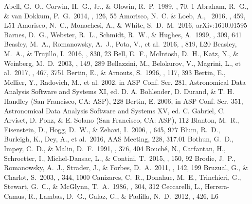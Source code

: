 \documentclass[twocolumn,trackchanges]{aastex61}
\begin{document}
\begin{thebibliography}{a}
 Abell, G.~O., Corwin, H.~G., Jr., \& Olowin, R.~P.\ 1989, \apjs, 70, 1 
 Abraham, R.~G., \& van Dokkum, P.~G.\ 2014, \pasp, 126, 55 
 Amorisco, N.~C. \& Loeb, A., \ 2016, \mnras, 459, L51
 Amorisco, N.~C., Monachesi, A., \& White, S.~D.~M.\ 2016, arXiv:1610.01595 
 Barnes, D.~G., Webster, R.~L., Schmidt, R.~W., \& Hughes, A.\ 1999, \mnras, 309, 641 
 Beasley, M.~A., Romanowsky, A.~J., Pota, V., et al.\ 2016, \apjl, 819, L20 
 Beasley, M.~A., \& Trujillo, I.\ 2016, \apj, 830, 23 
 Bell, E.~F., McIntosh, D.~H., Katz, N., \& Weinberg, M.~D.\ 2003, \apjs, 149, 289 
 Bellazzini, M., Belokurov, V., Magrini, L., et al.\ 2017, \mnras, 467, 3751 
 Bertin, E., \& Arnouts, S.\ 1996, \aaps, 117, 393 
 Bertin, E., Mellier, Y., Radovich, M., et al. 2002, in ASP Conf. Ser. 281, Astronomical Data Analysis Software and Systems XI, ed. D. A. Bohlender, D. Durand, \& T. H. Handley (San Francisco, CA: ASP), 228
 Bertin, E. 2006, in ASP Conf. Ser. 351, Astronomical Data Analysis Software and Systems XV, ed. C. Gabriel, C. Arviset, D. Ponz, \& E. Solano (San Francisco, CA: ASP), 112 
 Blanton, M.~R., Eisenstein, D., Hogg, D.~W., \& Zehavi, I.\ 2006, \apj, 645, 977 
 Blum, R.~D., Burleigh, K., Dey, A., et al.\ 2016, AAS Meeting, 228, 317.01 
 Bothun, G.~D., Impey, C.~D., \& Malin, D.~F.\ 1991, \apj, 376, 404 
 Bouch{\'e}, N., Carfantan, H., Schroetter, I., Michel-Dansac, L., \& Contini, T.\ 2015, \aj, 150, 92 
 Brodie, J.~P., Romanowsky, A.~J., Strader, J., \& Forbes, D.~A.\ 2011, \aj, 142, 199 
 Bruzual, G., \& Charlot, S.\ 2003, \mnras, 344, 1000 
 Canizares, C.~R., Donahue, M.~E., Trinchieri, G., Stewart, G.~C., \& McGlynn, T.~A.\ 1986, \apj, 304, 312 
 Ceccarelli, L., Herrera-Camus, R., Lambas, D.~G., Galaz, G., \& Padilla, N.~D.\ 2012, \mnras, 426, L6

\end{thebibliography}
\end{document}
